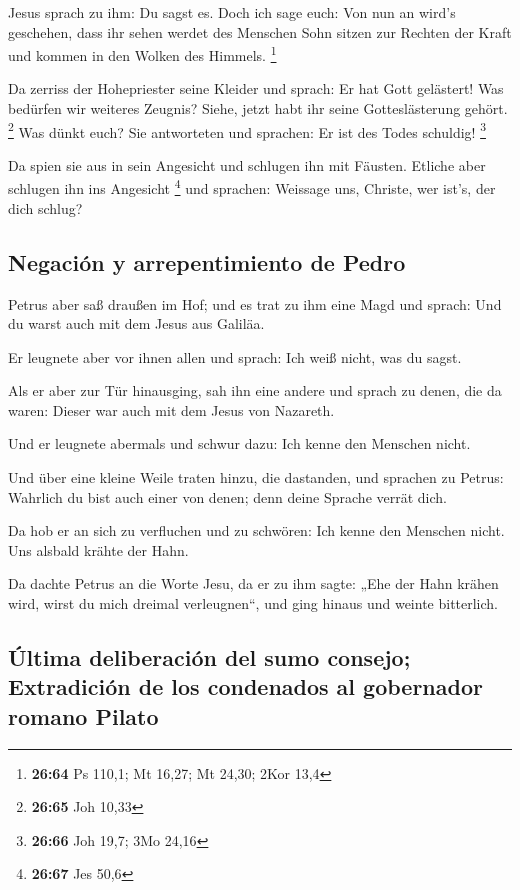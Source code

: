  Jesus sprach zu ihm: Du sagst es. Doch ich sage euch:
Von nun an wird's geschehen, dass ihr sehen werdet des Menschen Sohn
sitzen zur Rechten der Kraft und kommen in den Wolken des Himmels.
\footnote{\textbf{26:64} Ps 110,1; Mt 16,27; Mt 24,30; 2Kor 13,4}

 Da zerriss der Hohepriester seine Kleider und sprach: Er
hat Gott gelästert! Was bedürfen wir weiteres Zeugnis? Siehe, jetzt habt
ihr seine Gotteslästerung gehört. \footnote{\textbf{26:65} Joh 10,33}
 Was dünkt euch? Sie antworteten und sprachen: Er ist des
Todes schuldig! \footnote{\textbf{26:66} Joh 19,7; 3Mo 24,16}

 Da spien sie aus in sein Angesicht und schlugen ihn mit
Fäusten. Etliche aber schlugen ihn ins Angesicht \footnote{\textbf{26:67}
  Jes 50,6}  und sprachen: Weissage uns, Christe, wer
ist's, der dich schlug?

\hypertarget{negaciuxf3n-y-arrepentimiento-de-pedro}{%
\subsection{Negación y arrepentimiento de
Pedro}\label{negaciuxf3n-y-arrepentimiento-de-pedro}}

 Petrus aber saß draußen im Hof; und es trat zu ihm eine
Magd und sprach: Und du warst auch mit dem Jesus aus Galiläa.

 Er leugnete aber vor ihnen allen und sprach: Ich weiß
nicht, was du sagst.

 Als er aber zur Tür hinausging, sah ihn eine andere und
sprach zu denen, die da waren: Dieser war auch mit dem Jesus von
Nazareth.

 Und er leugnete abermals und schwur dazu: Ich kenne den
Menschen nicht.

 Und über eine kleine Weile traten hinzu, die dastanden,
und sprachen zu Petrus: Wahrlich du bist auch einer von denen; denn
deine Sprache verrät dich.

 Da hob er an sich zu verfluchen und zu schwören: Ich
kenne den Menschen nicht. Uns alsbald krähte der Hahn.

 Da dachte Petrus an die Worte Jesu, da er zu ihm sagte:
„Ehe der Hahn krähen wird, wirst du mich dreimal verleugnen``, und ging
hinaus und weinte bitterlich.

\hypertarget{uxfaltima-deliberaciuxf3n-del-sumo-consejo-extradiciuxf3n-de-los-condenados-al-gobernador-romano-pilato}{%
\subsection{Última deliberación del sumo consejo; Extradición de los
condenados al gobernador romano
Pilato}\label{uxfaltima-deliberaciuxf3n-del-sumo-consejo-extradiciuxf3n-de-los-condenados-al-gobernador-romano-pilato}}

